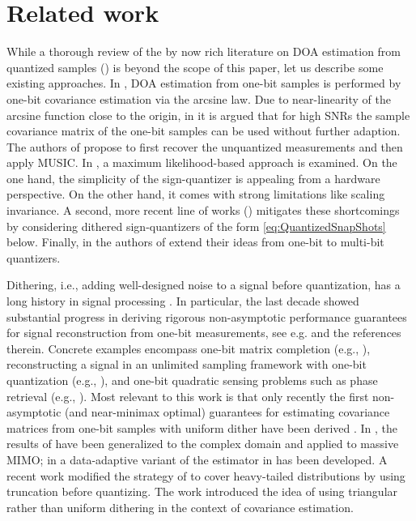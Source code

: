 \section{Related work}
\label{sec:RelatedWork}

While a thorough review of the by now rich literature on DOA estimation from quantized samples (\cite{BaW02,yu2016doa,HuL19,LSWW19,wei2020gridless,zhou2020direction,sedighi2021performance,li2024rocs}) is beyond the scope of this paper, let us describe some existing approaches. In \cite{BaW02}, DOA estimation from one-bit samples is performed by one-bit covariance estimation via the arcsine law. Due to near-linearity of the arcsine function close to the origin, in \cite{HuL19} it is argued that for high SNRs the sample covariance matrix of the one-bit samples can be used without further adaption. The authors of \cite{huang2019direction} propose to first recover the unquantized measurements and then apply MUSIC. In \cite{yoffe2019direction}, a maximum likelihood-based approach is examined.
On the one hand, the simplicity of the sign-quantizer is appealing from a hardware perspective. On the other hand, it comes with strong limitations like scaling invariance. A second, more recent line of works (\cite{PZXD24,YEES24}) mitigates these shortcomings by considering dithered sign-quantizers of the form \eqref{eq:QuantizedSnapShots} below. Finally, in \cite{sedighi2021doa} the authors of \cite{sedighi2021performance} extend their ideas from one-bit to multi-bit quantizers.

Dithering, i.e., adding well-designed noise to a signal before quantization, has a long history in signal processing \cite{Rob62}. In particular, the last decade showed substantial progress in deriving rigorous non-asymptotic performance guarantees for signal reconstruction from one-bit measurements, see e.g. \cite{BJK15,Dir19} and the references therein. Concrete examples encompass one-bit matrix completion (e.g., \cite{CaZ13,DPB14,chen2022high,EYS23}), reconstructing a signal in an unlimited sampling framework with one-bit quantization (e.g., \cite{EMY22,EMY23}), and one-bit quadratic sensing problems such as phase retrieval (e.g., \cite{EYN23,EYS22}). Most relevant to this work is that only recently the first non-asymptotic (and near-minimax optimal) guarantees for estimating covariance matrices from one-bit samples with uniform dither have been derived \cite{dirksen2022covariance}. In \cite{yang2023plug}, the results of \cite{dirksen2022covariance} have been generalized to the complex domain and applied to massive MIMO; in \cite{dirksen2024tuning} a data-adaptive variant of the estimator in \cite{dirksen2022covariance} has been developed. A recent work \cite{chen2022high} modified the strategy of \cite{dirksen2022covariance} to cover heavy-tailed distributions by using truncation before quantizing. The work \cite{chen2023parameter} introduced the idea of using triangular rather than uniform dithering in the context of covariance estimation. 

